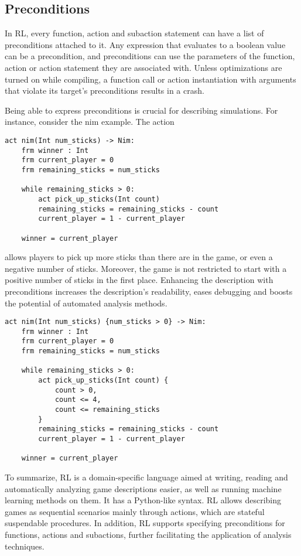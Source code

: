 \subsection{Preconditions}
In RL, every function, action and subaction statement can have a list of preconditions attached to it.
Any expression that evaluates to a boolean value can be a precondition, and preconditions can use the parameters of the function, action or action statement they are associated with.
Unless optimizations are turned on while compiling, a function call or action instantiation with arguments that violate its target's preconditions results in a crash.

Being able to express preconditions is crucial for describing simulations.
For instance, consider the nim example. The action 
\begin{lstlisting}
act nim(Int num_sticks) -> Nim:
    frm winner : Int
    frm current_player = 0
    frm remaining_sticks = num_sticks

    while remaining_sticks > 0:
        act pick_up_sticks(Int count)
        remaining_sticks = remaining_sticks - count
        current_player = 1 - current_player

    winner = current_player
\end{lstlisting}
allows players to pick up more sticks than there are in the game, or even a negative number of sticks.
Moreover, the game is not restricted to start with a positive number of sticks in the first place.
Enhancing the description with preconditions increases the description's readability, eases debugging and boosts the potential of automated analysis methods.
\begin{lstlisting}
act nim(Int num_sticks) {num_sticks > 0} -> Nim:
    frm winner : Int
    frm current_player = 0
    frm remaining_sticks = num_sticks

    while remaining_sticks > 0:
        act pick_up_sticks(Int count) {
            count > 0,
            count <= 4,
            count <= remaining_sticks
        }
        remaining_sticks = remaining_sticks - count
        current_player = 1 - current_player

    winner = current_player
\end{lstlisting}
To summarize, RL is a domain-specific language aimed at writing, reading and automatically analyzing game descriptions easier, as well as running machine learning methods on them.
It has a Python-like syntax. RL allows describing games as sequential scenarios mainly through actions, which are stateful suspendable procedures.
In addition, RL supports specifying preconditions for functions, actions and subactions, further facilitating the application of analysis techniques.